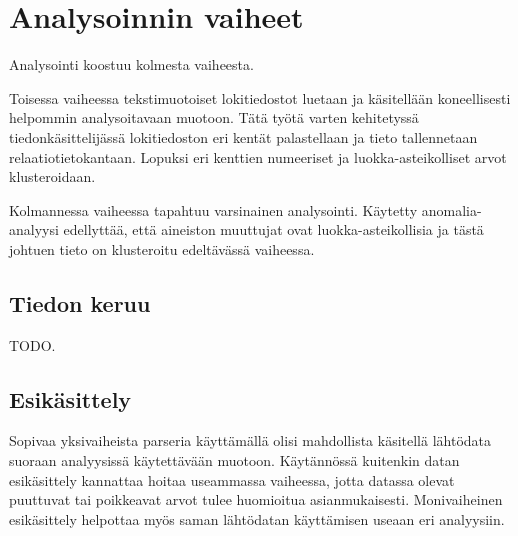 \section{Analysoinnin vaiheet}

Analysointi koostuu kolmesta vaiheesta.

Toisessa vaiheessa tekstimuotoiset lokitiedostot luetaan ja
käsitellään koneellisesti helpommin analysoitavaan
muotoon. Tätä työtä varten kehitetyssä tiedonkäsittelijässä
lokitiedoston eri kentät palastellaan ja tieto tallennetaan
relaatiotietokantaan. Lopuksi eri kenttien numeeriset ja
luokka-asteikolliset arvot klusteroidaan.

Kolmannessa vaiheessa tapahtuu varsinainen analysointi. Käytetty
anomalia-analyysi edellyttää, että aineiston muuttujat ovat
luokka-asteikollisia ja tästä johtuen tieto on klusteroitu edeltävässä vaiheessa.

\subsection{Tiedon keruu}

TODO.

\subsection{Esikäsittely}

Sopivaa yksivaiheista parseria käyttämällä olisi mahdollista käsitellä
lähtödata suoraan analyysissä käytettävään muotoon. Käytännössä kuitenkin datan
esikäsittely kannattaa hoitaa useammassa vaiheessa, jotta datassa
olevat puuttuvat tai poikkeavat arvot tulee huomioitua
asianmukaisesti. Monivaiheinen esikäsittely helpottaa myös saman
lähtödatan käyttämisen useaan eri analyysiin.

